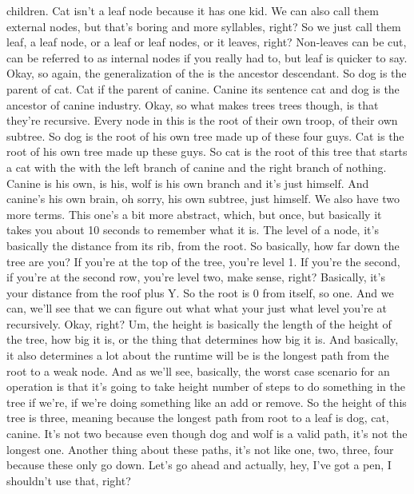 children. Cat isn't a leaf node because it has one kid. We can also call them external nodes, but that's boring and more syllables, right? So we just call them leaf, a leaf node, or a leaf or leaf nodes, or it leaves, right? Non-leaves can be cut, can be referred to as internal nodes if you really had to, but leaf is quicker to say. Okay, so again, the generalization of the is the ancestor descendant. So dog is the parent of cat. Cat if the parent of canine. Canine its sentence cat and dog is the ancestor of canine industry. Okay, so what makes trees trees though, is that they're recursive. Every node in this is the root of their own troop, of their own subtree. So dog is the root of his own tree made up of these four guys. Cat is the root of his own tree made up these guys. So cat is the root of this tree that starts a cat with the with the left branch of canine and the right branch of nothing. Canine is his own, is his, wolf is his own branch and it's just himself. And canine's his own brain, oh sorry, his own subtree, just himself. We also have two more terms. This one's a bit more abstract, which, but once, but basically it takes you about 10 seconds to remember what it is. The level of a node, it's basically the distance from its rib, from the root. So basically, how far down the tree are you? If you're at the top of the tree, you're level 1. If you're the second, if you're at the second row, you're level two, make sense, right? Basically, it's your distance from the roof plus Y. So the root is 0 from itself, so one. And we can, we'll see that we can figure out what what your just what level you're at recursively. Okay, right? Um, the height is basically the length of the height of the tree, how big it is, or the thing that determines how big it is. And basically, it also determines a lot about the runtime will be is the longest path from the root to a weak node. And as we'll see, basically, the worst case scenario for an operation is that it's going to take height number of steps to do something in the tree if we're, if we're doing something like an add or remove. So the height of this tree is three, meaning because the longest path from root to a leaf is dog, cat, canine. It's not two because even though dog and wolf is a valid path, it's not the longest one. Another thing about these paths, it's not like one, two, three, four because these only go down. Let's go ahead and actually, hey, I've got a pen, I shouldn't use that, right? 
 
